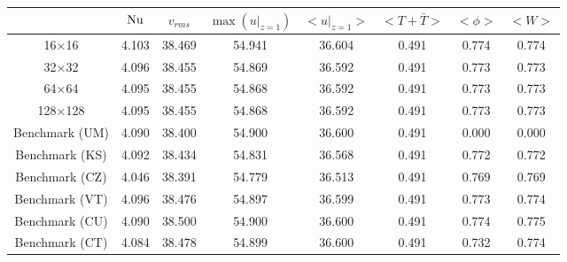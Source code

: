 \begin{tabular}{c|ccccccc}
    & $\mathrm{Nu}$ & $v_{rms}$ & $\max(u|_{z=1})$ & $<u|_{z=1}>$ & $<T + \bar{T}>$ & $<\phi>$ & $<W>$ \\
\hline
16$\times$16 & 4.103 & 38.469 & 54.941 & 36.604 & 0.491 & 0.774 & 0.774 \\
32$\times$32 & 4.096 & 38.455 & 54.869 & 36.592 & 0.491 & 0.773 & 0.773 \\
64$\times$64 & 4.095 & 38.455 & 54.868 & 36.592 & 0.491 & 0.773 & 0.773 \\
128$\times$128 & 4.095 & 38.455 & 54.868 & 36.592 & 0.491 & 0.773 & 0.773 \\
\hline
Benchmark (UM) & 4.090 & 38.400 & 54.900 & 36.600 & 0.491 & 0.000 & 0.000 \\
Benchmark (KS) & 4.092 & 38.434 & 54.831 & 36.568 & 0.491 & 0.772 & 0.772 \\
Benchmark (CZ) & 4.046 & 38.391 & 54.779 & 36.513 & 0.491 & 0.769 & 0.769 \\
Benchmark (VT) & 4.096 & 38.476 & 54.897 & 36.599 & 0.491 & 0.773 & 0.774 \\
Benchmark (CU) & 4.090 & 38.500 & 54.900 & 36.600 & 0.491 & 0.774 & 0.775 \\
Benchmark (CT) & 4.084 & 38.478 & 54.899 & 36.600 & 0.491 & 0.732 & 0.774 \\
\end{tabular}
